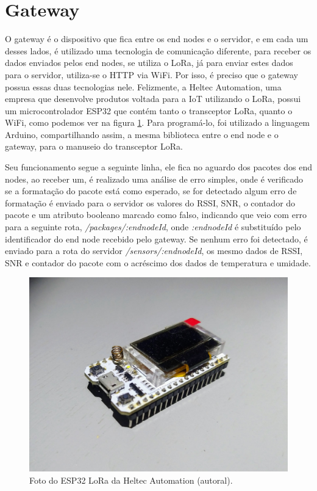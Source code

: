 \section{Gateway}
\label{metod:gateway}
O gateway é o dispositivo que fica entre os end nodes e o servidor, e em cada um desses lados, é utilizado uma tecnologia de comunicação diferente, para receber os dados enviados pelos end nodes, se utiliza o LoRa, já para enviar estes dados para o servidor, utiliza-se o HTTP via WiFi. Por isso, é preciso que o gateway possua essas duas tecnologias nele. Felizmente, a Heltec Automation, uma empresa que desenvolve produtos voltada para a IoT utilizando o LoRa, possui um microcontrolador ESP32 que contém tanto o transceptor LoRa, quanto o WiFi, como podemos ver na figura \ref{fig:esp32-lora}. Para programá-lo, foi utilizado a linguagem Arduino, compartilhando assim, a mesma biblioteca entre o end node e o gateway, para o manuseio do transceptor LoRa.

Seu funcionamento segue a seguinte linha, ele fica no aguardo dos pacotes dos end nodes, ao receber um, é realizado uma análise de erro simples, onde é verificado se a formatação do pacote está como esperado, se for detectado algum erro de formatação é enviado para o servidor os valores do RSSI, SNR, o contador do pacote e um atributo booleano marcado como falso, indicando que veio com erro para a seguinte rota, \textit{/packages/:endnodeId}, onde \textit{:endnodeId} é substituído pelo identificador do end node recebido pelo gateway. Se nenhum erro foi detectado, é enviado para a rota do servidor \textit{/sensors/:endnodeId}, os mesmo dados de RSSI, SNR e contador do pacote com o acréscimo dos dados de temperatura e umidade.

\begin{figure}[H]
  \centering
  \includegraphics[width=.80\textwidth]{assets/esp32-lora.png} 
  \caption{Foto do ESP32 LoRa da Heltec Automation (autoral).}
  \label{fig:esp32-lora} 
\end{figure}

